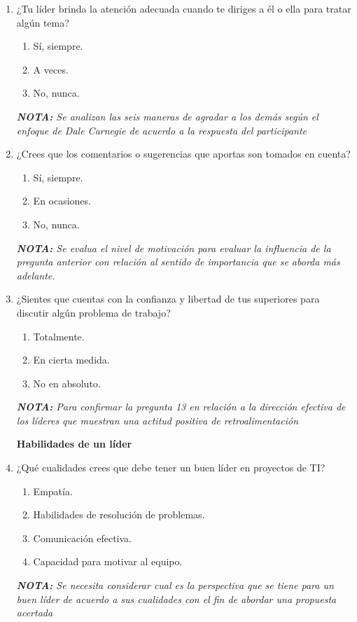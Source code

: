 \documentclass[journal]{IEEEtran}
\begin{document}
\begin{enumerate}
	\item ¿Tu líder brinda la atención adecuada cuando te diriges a él o ella para tratar algún tema?
	\begin{enumerate}
		\item Sí, siempre.
		\item A veces.
		\item No, nunca.
	\end{enumerate}
	\textit{\textbf{NOTA:} Se analizan las seis maneras de agradar a los demás según el enfoque de Dale Carnegie de acuerdo a la respuesta del participante}
	
	\item ¿Crees que los comentarios o sugerencias que aportas son tomados en cuenta?
	\begin{enumerate}
		\item Sí, siempre.
		\item En ocasiones.
		\item No, nunca.
	\end{enumerate}
	\textit{\textbf{NOTA:} Se evalua el nivel de motivación para evaluar la influencia de la pregunta anterior con relación al sentido de importancia que se aborda más adelante.}
	
	
	\item ¿Sientes que cuentas con la confianza y libertad de tus superiores para discutir algún problema de trabajo?
	\begin{enumerate}
		\item Totalmente.
		\item En cierta medida.
		\item No en absoluto.
	\end{enumerate}
	\textit{\textbf{NOTA:} Para confirmar la pregunta 13 en relación a la dirección efectiva de los líderes que muestran una actitud positiva de retroalimentación}
	
	\begin{center}
		\textbf{Habilidades de un líder}
	\end{center}
	
	\item ¿Qué cualidades crees que debe tener un buen líder en proyectos de TI?
	\begin{enumerate}
		\item Empatía.
		\item Habilidades de resolución de problemas.
		\item Comunicación efectiva.
		\item Capacidad para motivar al equipo.
	\end{enumerate}
	\textit{\textbf{NOTA:} Se necesita considerar cual es la perspectiva que se tiene para un buen líder de acuerdo a sus cualidades con el fin de abordar una propuesta acertada}
	

\end{enumerate}
\end{document}
